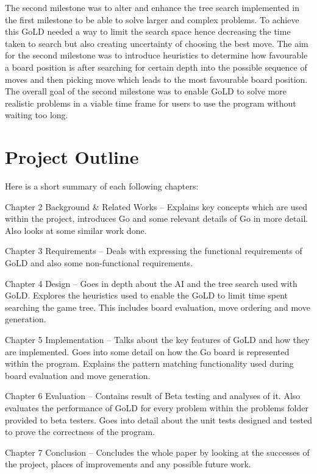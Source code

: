\documentclass{l4proj}
\begin{document}
The second milestone was to alter and enhance the tree search implemented in the first milestone to be able to solve larger and complex problems. To achieve this GoLD needed a way to limit the search space hence decreasing the time taken to search but also creating uncertainty of choosing the best move. The aim for the second milestone was to introduce heuristics to determine how favourable a board position is after searching for certain depth into the possible sequence of moves and then picking move which leads to the most favourable board position. The overall goal of the second milestone was to enable GoLD to solve more realistic problems in a viable time frame for users to use the program without waiting too long.

\section{Project Outline}

Here is a short summary of each following chapters:

Chapter 2 Background \& Related Works – Explains key concepts which are used within the project, introduces Go and some relevant details of Go in more detail. Also looks at some similar work done.

Chapter 3 Requirements – Deals with expressing the functional requirements of GoLD and also some non-functional requirements.


Chapter 4 Design – Goes in depth about the AI and the tree search used with GoLD.  Explores the heuristics used to enable the GoLD to limit time spent searching the game tree. This includes board evaluation, move ordering and move generation.

Chapter 5 Implementation – Talks about the key features of GoLD and how they are implemented. Goes into some detail on how the Go board is represented within the program. Explains the pattern matching functionality used during board evaluation and move generation.

Chapter 6 Evaluation – Contains result of Beta testing and analyses of it. Also evaluates the performance of GoLD for every problem within the problems folder provided to beta testers. Goes into detail about the unit tests designed and tested to prove the correctness of the program.

Chapter 7 Conclusion – Concludes the whole paper by looking at the successes of the project, places of improvements and any possible future work.
\end{document}
